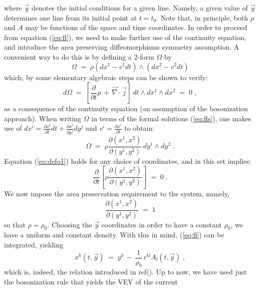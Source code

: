 \documentclass[a4paper,12pt]{article}
\begin{document}
where ${\vec y}$ denotes the initial conditions for a given line.
Namely, a given value of ${\vec y}$ determines one line from its
initial point at $t=t_0$. Note that, in principle, both $\rho$ and
$A$
may be functions of the space and time coordinates. In order to
proceed from equation (\ref{eq:fl}), we need to make further use of
the continuity equation, and introduce the area preserving
diffeomorphisms symmetry assumption.  A convenient way to do this
is
by defining a 2-form $\Omega$ by
\begin{equation}
  \label{defom}
\Omega \;=\; \rho (dx^1-v^1 dt) \land (dx^2-v^2 dt) 
\end{equation}
which, by some elementary algebraic steps can be shown to verify:
\begin{equation}
  \label{eq:defo1}
d \Omega \;=\; [ \frac{\partial}{\partial t} \rho \,+\, {\vec
\nabla}\cdot{\vec j} ] \, dt \land dx^1 \land dx^2 \;=\; 0\;,
\end{equation}
as a consequence of the continuity equation (an assumption of the
bosonization approach). When writing $\Omega$ in terms of the
formal
solutions (\ref{eq:fls}), one makes use of $dx^i = \frac{\partial
x^i}{\partial t}
dt + \frac{\partial x^i}{\partial y^j} dy^j$ and $v^i =
\frac{\partial x^i}{\partial t}$ to
obtain:
\begin{equation}
  \label{eq:defo2}
\Omega \;=\; \rho \frac{\partial (x^1,x^2)}{\partial (y^1,y^2)} \,
dy^1 \land dy^2 \;.
\end{equation}
Equation (\ref{eq:defo1}) holds for any choice of coordinates, and
in
this set implies:
\begin{equation}
  \label{equation}
\frac{\partial}{\partial t} [\rho \frac{\partial
(x^1,x^2)}{\partial (y^1,y^2)}] \;=\; 0\;.  
\end{equation}
We now impose the area preservation requirement to the system,
namely,
\begin{equation}
  \label{eq:apt}
 \frac{\partial (x^1,x^2)}{\partial (y^1,y^2)} \;=\; 1
\end{equation}
so that $\rho = \rho_0$. Choosing the ${\vec y}$ coordinates in
order to
have a constant $\rho_0$, we have a uniform and constant density.
With
this in mind, (\ref{eq:fl}) can be integrated, yielding
\begin{equation}
  \label{eq:flsol}
x^k (t,{\vec y}) \;=\; y^k \,-\, \frac{1}{\rho_0} \, \epsilon^{kl}
A_l (t,{\vec y}) \;,
\end{equation}  
which is, indeed, the relation introduced in ref(). Up to now, we
have
used just the bosonization rule that yields the VEV of the current
\end{document}
